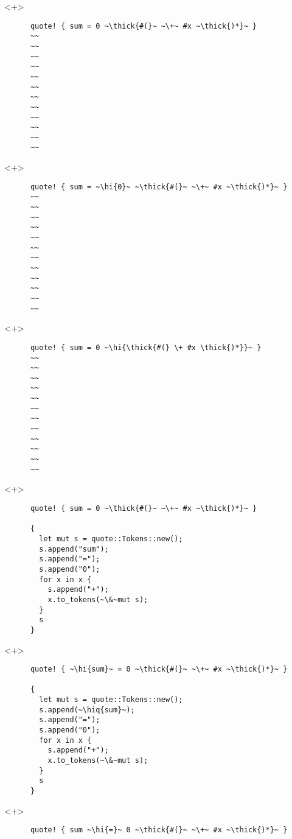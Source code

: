 \documentclass[usepdftitle=false]{beamer}
\renewcommand{\&}{\makebox[\widthof{\ampersand}][c]{\scalebox{0.9}[1.0]{\Book\ampersand}}}
\newcommand{\+}{\makebox[\widthof{+}][c]{\raisebox{-.2\height}{\scalefont{1.5}\Light+}}}
\newcommand{\thick}[1]{\contourlength{0.12pt}\contour[10]{black}{#1}}
\newcommand{\hi}[1]{%
\tikz[baseline=(A.base)]
 \node[highlighting=0,inner sep=0pt,text depth=0pt] (A) {#1};%
}
\newcommand{\hiq}[1]{\hi{''#1''}}
\begin{document}
\begin{frame}[fragile]
  \begin{onlyenv}<+>
    \begin{verbatim}
      quote! { sum = 0 ~\thick{#(}~ ~\+~ #x ~\thick{)*}~ }
      ~~
      ~~
      ~~
      ~~
      ~~
      ~~
      ~~
      ~~
      ~~
      ~~
      ~~
      ~~
    \end{verbatim}
  \end{onlyenv}
  \begin{onlyenv}<+>
    \begin{verbatim}
      quote! { sum = ~\hi{0}~ ~\thick{#(}~ ~\+~ #x ~\thick{)*}~ }
      ~~
      ~~
      ~~
      ~~
      ~~
      ~~
      ~~
      ~~
      ~~
      ~~
      ~~
      ~~
    \end{verbatim}
  \end{onlyenv}
  \begin{onlyenv}<+>
    \begin{verbatim}
      quote! { sum = 0 ~\hi{\thick{#(} \+ #x \thick{)*}}~ }
      ~~
      ~~
      ~~
      ~~
      ~~
      ~~
      ~~
      ~~
      ~~
      ~~
      ~~
      ~~
    \end{verbatim}
  \end{onlyenv}
  \begin{onlyenv}<+>
    \begin{verbatim}
      quote! { sum = 0 ~\thick{#(}~ ~\+~ #x ~\thick{)*}~ }

      {
        let mut s = quote::Tokens::new();
        s.append("sum");
        s.append("=");
        s.append("0");
        for x in x {
          s.append("+");
          x.to_tokens(~\&~mut s);
        }
        s
      }
    \end{verbatim}
  \end{onlyenv}
  \begin{onlyenv}<+>
    \begin{verbatim}
      quote! { ~\hi{sum}~ = 0 ~\thick{#(}~ ~\+~ #x ~\thick{)*}~ }

      {
        let mut s = quote::Tokens::new();
        s.append(~\hiq{sum}~);
        s.append("=");
        s.append("0");
        for x in x {
          s.append("+");
          x.to_tokens(~\&~mut s);
        }
        s
      }
    \end{verbatim}
  \end{onlyenv}
  \begin{onlyenv}<+>
    \begin{verbatim}
      quote! { sum ~\hi{=}~ 0 ~\thick{#(}~ ~\+~ #x ~\thick{)*}~ }


\end{verbatim}
\end{onlyenv}
\end{frame}
\end{document}
